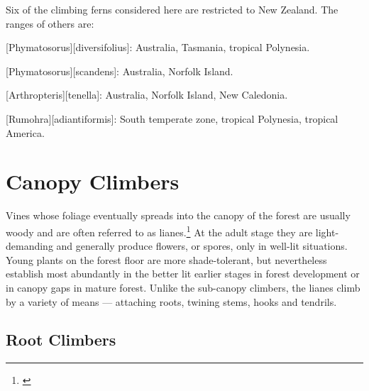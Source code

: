 Six of the climbing ferns considered here are restricted to New Zealand.
The ranges of others are:

[Phymatosorus][diversifolius]: Australia, Tasmania, tropical Polynesia.

[Phymatosorus][scandens]: Australia, Norfolk Island.

[Arthropteris][tenella]: Australia, Norfolk Island, New Caledonia.

[Rumohra][adiantiformis]: South temperate zone, tropical Polynesia, tropical America.

\section{Canopy Climbers}

Vines whose foliage eventually spreads into the canopy of the forest are usually woody and are often referred to as lianes.\footnote{\cite{bird1916observations}}
At the adult stage they are light-demanding and generally produce flowers, or spores, only in well-lit situations.
Young plants on the forest floor are more shade-tolerant, but nevertheless establish most abundantly in the better lit earlier stages in forest development or in canopy gaps in mature forest.
Unlike the sub-canopy climbers, the lianes climb by a variety of means --- attaching roots, twining stems, hooks and tendrils.

\subsection{Root Climbers}

